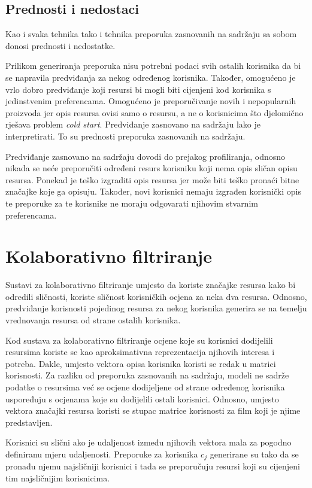 \documentclass[times, utf8, seminar]{fer}
\begin{document}
\section{Prednosti i nedostaci}
Kao i svaka tehnika tako i tehnika preporuka zasnovanih na sadržaju sa sobom donosi prednosti i nedostatke.

Prilikom generiranja preporuka nisu potrebni podaci svih ostalih korisnika da bi se napravila predviđanja za nekog određenog korisnika. Također, omogućeno je vrlo dobro predviđanje koji resursi bi mogli biti cijenjeni kod korisnika s jedinstvenim preferencama. Omogućeno je preporučivanje novih i nepopularnih proizvoda jer opis resursa ovisi samo o resursu, a ne o korisnicima što djelomično rješava problem \textit{cold start}. Predviđanje zasnovano na sadržaju lako je interpretirati. To su prednosti preporuka zasnovanih na sadržaju.

Predviđanje zasnovano na sadržaju dovodi do prejakog profiliranja, odnosno nikada se neće preporučiti određeni resurs korisniku koji nema opis sličan opisu resursa. Ponekad je teško izgraditi opis resursa jer može biti teško pronaći bitne značajke koje ga opisuju. Također, novi korisnici nemaju izgrađen korisnički opis te preporuke za te korisnike ne moraju odgovarati njihovim stvarnim preferencama.

\chapter{Kolaborativno filtriranje}
Sustavi za kolaborativno filtriranje umjesto da koriste značajke resursa kako bi odredili sličnosti, koriste sličnost korisničkih ocjena za neka dva resursa. Odnosno, predviđanje korisnosti pojedinog resursa za nekog korisnika generira se na temelju vrednovanja resursa od strane ostalih korisnika. 

Kod sustava za kolaborativno filtriranje ocjene koje su korisnici dodijelili resursima koriste se kao aproksimativna reprezentacija njihovih interesa i potreba. Dakle, umjesto vektora opisa korisnika koristi se redak u matrici korisnosti. Za razliku od preporuka zasnovanih na sadržaju, modeli ne sadrže podatke o resursima već se ocjene dodijeljene od strane određenog korisnika uspoređuju s ocjenama koje su dodijelili ostali korisnici. Odnosno, umjesto vektora značajki resursa koristi se stupac matrice korisnosti za film koji je njime predstavljen. 

Korisnici su slični ako je udaljenost između njihovih vektora mala za pogodno definiranu mjeru udaljenosti. Preporuke za korisnika $c_j$ generirane su tako da se pronađu njemu najsličniji korisnici i tada se preporučuju resursi koji su cijenjeni tim najsličnijim korisnicima.
\end{document}
